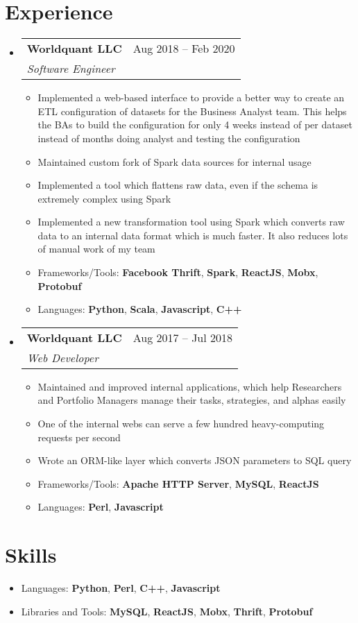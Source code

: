 \documentclass[a4paper,11pt]{article}
\makeatletter
\newcommand{\resumeItem}[1]{
  \item\small{
    {#1 \vspace{-2pt}}
  }
}
\newcommand{\resumeSubhead}[3]{
  \vspace{-1pt}\item
    \begin{tabular*}{0.97\textwidth}{l@{\extracolsep{\fill}}r}
      \textbf{#1} & #2 \\
      \textit{\normalsize#3}
    \end{tabular*}\vspace{-5pt}
}
\newcommand{\resumeSubHeadingListStart}{\begin{itemize}[leftmargin=*]}
\newcommand{\resumeSubHeadingListEnd}{\end{itemize}}
\newcommand{\resumeItemListStart}{\begin{itemize}}
\newcommand{\resumeItemListEnd}{\end{itemize}\vspace{-5pt}}
\makeatother
\begin{document}
\section{Experience}
  \resumeSubHeadingListStart
    \resumeSubhead
      {Worldquant LLC}{Aug 2018 – Feb 2020}
      {Software Engineer}
      \resumeItemListStart
        \resumeItem{Implemented a web-based interface to provide a better way to create an ETL configuration of datasets for the Business Analyst team. This helps the BAs to build the configuration for only 4 weeks instead of per dataset instead of months doing analyst and testing the configuration}
        \resumeItem{Maintained custom fork of Spark data sources for internal usage}
        \resumeItem{Implemented a tool which flattens raw data, even if the schema is extremely complex using Spark}
        \resumeItem{Implemented a new transformation tool using Spark which converts raw data to an internal data format which is much faster. It also reduces lots of manual work of my team}
        \resumeItem{Frameworks/Tools: \textbf{Facebook Thrift}, \textbf{Spark}, \textbf{ReactJS}, \textbf{Mobx}, \textbf{Protobuf}}
        \resumeItem{Languages: \textbf{Python}, \textbf{Scala}, \textbf{Javascript}, \textbf{C++}}
      \resumeItemListEnd

    \resumeSubhead
      {Worldquant LLC}{Aug 2017 – Jul 2018}
      {Web Developer}
      \resumeItemListStart
        \resumeItem{Maintained and improved internal applications, which help Researchers and Portfolio Managers manage their tasks, strategies, and alphas easily}
        \resumeItem{One of the internal webs can serve a few hundred heavy-computing requests per second}
        \resumeItem{Wrote an ORM-like layer which converts JSON parameters to SQL query}
        \resumeItem{Frameworks/Tools: \textbf{Apache HTTP Server}, \textbf{MySQL}, \textbf{ReactJS}}
        \resumeItem{Languages: \textbf{Perl}, \textbf{Javascript}}
      \resumeItemListEnd
  \resumeSubHeadingListEnd

\section{Skills}
  \resumeItemListStart
    \resumeItem{Languages: \textbf{Python}, \textbf{Perl}, \textbf{C++}, \textbf{Javascript}}
    \resumeItem{Libraries and Tools: \textbf{MySQL}, \textbf{ReactJS}, \textbf{Mobx}, \textbf{Thrift}, \textbf{Protobuf}}
  \resumeItemListEnd
\end{document}
